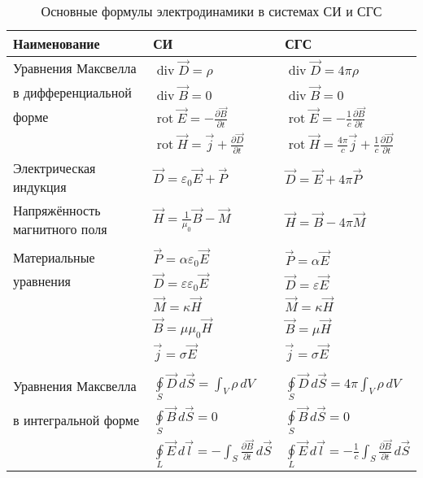 \begin{table}
\newcommand{\divv}{\mathop{\mathrm{div}}}
\newcommand{\rot}{\mathop{\mathrm{rot}}}
\caption{Основные формулы электродинамики в системах СИ и СГС}
\begin{tabular}{>{\small}m{30mm} m{35mm} m{35mm}}
Наименование & СИ & СГС\\ \hline
Уравнения Максвелла &$\divv\vec{D}=\rho$&$\divv\vec{D}=4\pi\rho$\\
в дифференциальной &$\divv\vec{B}=0$&$\divv\vec{B}=0$\\
форме &$\rot\vec{E}=-\frac{\partial\vec{B}}{\partial t}$&$\rot\vec{E}=
    -\frac{1}{c}\frac{\partial\vec{B}}{\partial t}$\\
 &$\rot\vec{H}=\vec{j}+\frac{\partial\vec{D}}{\partial t}$&$\rot\vec{H}=
 \frac{4\pi}{c}\vec{j}+\frac{1}{c}\frac{\partial\vec{D}}{\partial t}$\\
Электрическая индукция &$\vec{D}=\varepsilon_0\vec{E}+\vec{P}$&$\vec{D}=\vec{E}+4\pi\vec{P}$\\
Напряжённость магнитного поля &$\vec{H}=\frac{1}{\mu_0}\vec{B}-\vec{M}$&$\vec{H}=\vec{B}-4\pi\vec{M}$\\
\\
Материальные &$\vec{P}=\alpha\varepsilon_0\vec{E}$&$\vec{P}=\alpha\vec{E}$\\
уравнения &$\vec{D}=\varepsilon\varepsilon_0\vec{E}$&$\vec{D}=\varepsilon\vec{E}$\\
&$\vec{M}=\kappa\vec{H}$&$\vec{M}=\kappa\vec{H}$\\
&$\vec{B}=\mu\mu_0\vec{H}$&$\vec{B}=\mu\vec{H}$\\
&$\vec{j}=\sigma\vec{E}$&$\vec{j}=\sigma\vec{E}$\\
\\
Уравнения Максвелла &$\oint\limits_{S}\vec{D}\,d\vec{S}=\int_{V}\rho\,dV$&
$\oint\limits_{S}\vec{D}\,d\vec{S}=4\pi\int_{V}\rho\,dV$\\
в интегральной форме &$\oint\limits_{S}\vec{B}\,d\vec{S}=0$&$\oint\limits_{S}\vec{B}\,d\vec{S}=0$\\
 &$\oint\limits_{L}\vec{E}\,d\vec{l}=-\int_{S}\frac{\partial\vec{B}}{\partial t}\,d\vec{S}$&
 $\oint\limits_{L}\vec{E}\,d\vec{l}=-\frac{1}{c}\int_{S}\frac{\partial\vec{B}}{\partial t}\,d\vec{S}$\\

\end{tabular}
\end{table}
